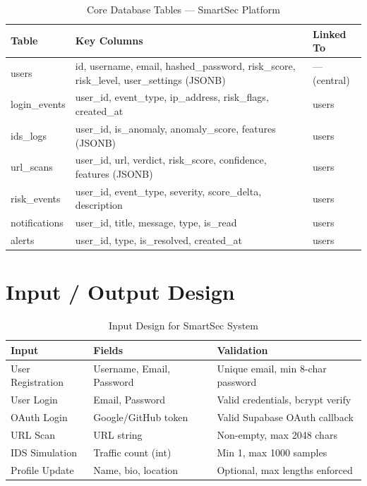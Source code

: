\begin{table}[H]
\centering
\caption{Core Database Tables --- SmartSec Platform}
\begin{tabular}{|p{3.5cm}|p{8cm}|p{2.5cm}|}
\hline
\textbf{Table} & \textbf{Key Columns} & \textbf{Linked To} \\
\hline
users & id, username, email, hashed\_password, risk\_score, risk\_level, user\_settings (JSONB) & --- (central) \\
\hline
login\_events & user\_id, event\_type, ip\_address, risk\_flags, created\_at & users \\
\hline
ids\_logs & user\_id, is\_anomaly, anomaly\_score, features (JSONB) & users \\
\hline
url\_scans & user\_id, url, verdict, risk\_score, confidence, features (JSONB) & users \\
\hline
risk\_events & user\_id, event\_type, severity, score\_delta, description & users \\
\hline
notifications & user\_id, title, message, type, is\_read & users \\
\hline
alerts & user\_id, type, is\_resolved, created\_at & users \\
\hline
\end{tabular}
\end{table}

\section{Input / Output Design}

\begin{table}[H]
\centering
\caption{Input Design for SmartSec System}
\begin{tabular}{|p{3.5cm}|p{4cm}|p{4cm}|}
\hline
\textbf{Input} & \textbf{Fields} & \textbf{Validation} \\
\hline
User Registration & Username, Email, Password & Unique email, min 8-char password \\
User Login & Email, Password & Valid credentials, bcrypt verify \\
OAuth Login & Google/GitHub token & Valid Supabase OAuth callback \\
URL Scan & URL string & Non-empty, max 2048 chars \\
IDS Simulation & Traffic count (int) & Min 1, max 1000 samples \\
Profile Update & Name, bio, location & Optional, max lengths enforced \\
\hline
\end{tabular}
\end{table}


